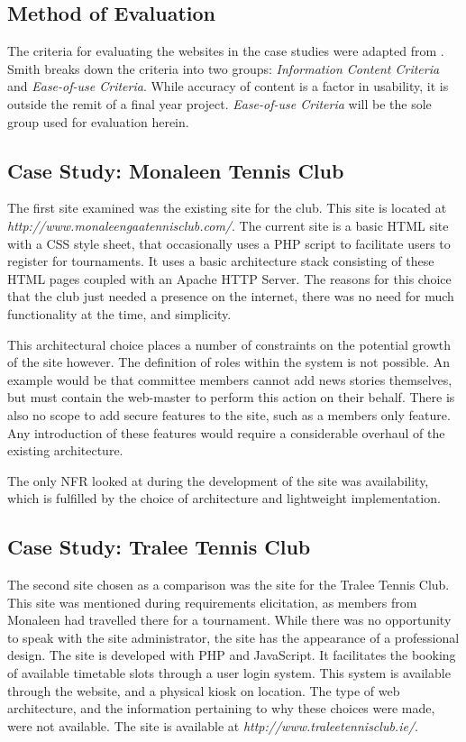 \subsection{Method of Evaluation}

The criteria for evaluating the websites in the case studies were adapted from \cite{smith2001applying}. Smith breaks down the criteria into two groups: \textit{Information Content Criteria} and \textit{Ease-of-use Criteria}. While accuracy of content is a factor in usability, it is outside the remit of a final year project. \textit{Ease-of-use Criteria} will be the sole group used for evaluation herein. 


\subsection{Case Study: Monaleen Tennis Club}

The first site examined was the existing site for the club. This site is located at \newline\textit{http://www.monaleengaatennisclub.com/}. The current site is a basic HTML site with a CSS style sheet, that occasionally uses a PHP script to facilitate users to register for tournaments. It uses a basic architecture stack consisting of these HTML pages coupled with an Apache HTTP Server. The reasons for this choice that the club just needed a presence on the internet, there was no need for much functionality at the time, and simplicity.

This architectural choice places a number of constraints on the potential growth of the site however. The definition of roles within the system is not possible. An example would be that committee members cannot add news stories themselves, but must contain the web-master to perform this action on their behalf. There is also no scope to add secure features to the site, such as a members only feature. Any introduction of these features would require a considerable overhaul of the existing architecture.

The only NFR looked at during the development of the site was availability, which is fulfilled by the choice of architecture and lightweight implementation. 

\subsection{Case Study: Tralee Tennis Club}

The second site chosen as a comparison was the site for the Tralee Tennis Club. This site was mentioned during requirements elicitation, as members from Monaleen had travelled there for a tournament. While there was no opportunity to speak with the site administrator, the site has the appearance of a professional design. The site is developed with PHP and JavaScript. It facilitates the booking of available timetable slots through a user login system. This system is available through the website, and a physical kiosk on location. The type of web architecture, and the information pertaining to why these choices were made, were not available. The site is available at \textit{http://www.traleetennisclub.ie/}.
\newpage

